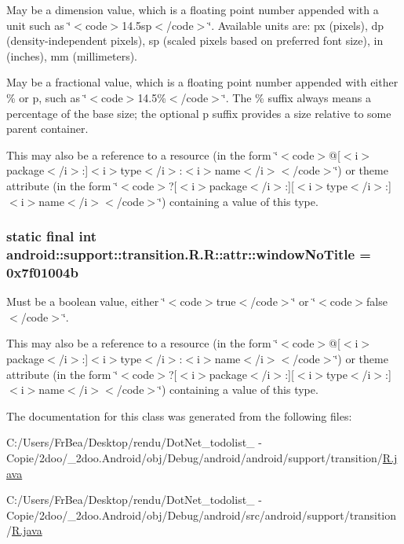 May be a dimension value, which is a floating point number appended with a unit such as \char`\"{}$<$code$>$14.5sp$<$/code$>$\char`\"{}. Available units are: px (pixels), dp (density-independent pixels), sp (scaled pixels based on preferred font size), in (inches), mm (millimeters). 

May be a fractional value, which is a floating point number appended with either \% or p, such as \char`\"{}$<$code$>$14.5\%$<$/code$>$\char`\"{}. The \% suffix always means a percentage of the base size; the optional p suffix provides a size relative to some parent container. 

This may also be a reference to a resource (in the form \char`\"{}$<$code$>$@\mbox{[}$<$i$>$package$<$/i$>$:\mbox{]}$<$i$>$type$<$/i$>$:$<$i$>$name$<$/i$>$$<$/code$>$\char`\"{}) or theme attribute (in the form \char`\"{}$<$code$>$?\mbox{[}$<$i$>$package$<$/i$>$:\mbox{]}\mbox{[}$<$i$>$type$<$/i$>$:\mbox{]}$<$i$>$name$<$/i$>$$<$/code$>$\char`\"{}) containing a value of this type. \hypertarget{classandroid_1_1support_1_1transition_1_1_r_1_1attr_b3d4155d10e6e69e2374be2bf6f516f2}{
\subsubsection[{windowNoTitle}]{\setlength{\rightskip}{0pt plus 5cm}static final int android::support::transition.R.R::attr::windowNoTitle = 0x7f01004b}}
\label{classandroid_1_1support_1_1transition_1_1_r_1_1attr_b3d4155d10e6e69e2374be2bf6f516f2}


Must be a boolean value, either \char`\"{}$<$code$>$true$<$/code$>$\char`\"{} or \char`\"{}$<$code$>$false$<$/code$>$\char`\"{}. 

This may also be a reference to a resource (in the form \char`\"{}$<$code$>$@\mbox{[}$<$i$>$package$<$/i$>$:\mbox{]}$<$i$>$type$<$/i$>$:$<$i$>$name$<$/i$>$$<$/code$>$\char`\"{}) or theme attribute (in the form \char`\"{}$<$code$>$?\mbox{[}$<$i$>$package$<$/i$>$:\mbox{]}\mbox{[}$<$i$>$type$<$/i$>$:\mbox{]}$<$i$>$name$<$/i$>$$<$/code$>$\char`\"{}) containing a value of this type. 

The documentation for this class was generated from the following files:\begin{CompactItemize}
\item 
C:/Users/FrBea/Desktop/rendu/DotNet\_\-todolist\_ - Copie/2doo/\_\-2doo.Android/obj/Debug/android/android/support/transition/\hyperlink{android_2support_2transition_2_r_8java}{R.java}\item 
C:/Users/FrBea/Desktop/rendu/DotNet\_\-todolist\_ - Copie/2doo/\_\-2doo.Android/obj/Debug/android/src/android/support/transition/\hyperlink{src_2android_2support_2transition_2_r_8java}{R.java}\end{CompactItemize}
